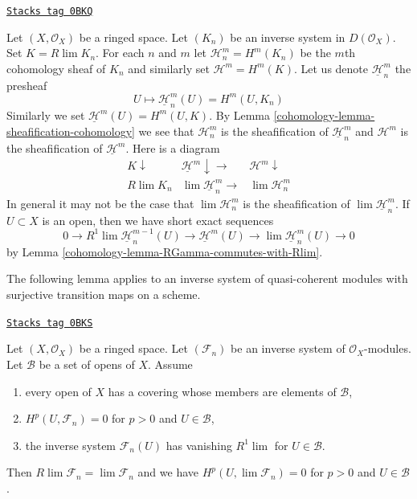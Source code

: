 \begin{remark}
\label{cohomology-remark-discuss-derived-limit}
\href{https://stacks.math.columbia.edu/tag/0BKQ}{\texttt{Stacks tag 0BKQ}}

Let $(X, \mathcal{O}_X)$ be a ringed space. Let $(K_n)$ be an inverse
system in $D(\mathcal{O}_X)$. Set $K = R\lim K_n$. For each $n$ and $m$
let $\mathcal{H}^m_n = H^m(K_n)$ be the $m$th cohomology sheaf of
$K_n$ and similarly set $\mathcal{H}^m = H^m(K)$. Let us denote
$\underline{\mathcal{H}}^m_n$ the presheaf
$$
U \longmapsto \underline{\mathcal{H}}^m_n(U) = H^m(U, K_n)
$$
Similarly we set $\underline{\mathcal{H}}^m(U) = H^m(U, K)$.
By Lemma \ref{cohomology-lemma-sheafification-cohomology} we see that
$\mathcal{H}^m_n$ is the sheafification of
$\underline{\mathcal{H}}^m_n$ and $\mathcal{H}^m$ is the
sheafification of $\underline{\mathcal{H}}^m$.
Here is a diagram
$$
\begin{array}{ccc}K \downarrow & \underline{\mathcal{H}}^m \downarrow\longrightarrow & \mathcal{H}^m \downarrow \\ R\lim K_n & \lim \underline{\mathcal{H}}^m_n \longrightarrow & \lim \mathcal{H}^m_n\end{array}
$$
In general it may not be the case that
$\lim \mathcal{H}^m_n$ is the sheafification of
$\lim \underline{\mathcal{H}}^m_n$.
If $U \subset X$ is an open, then we have short exact
sequences
\begin{equation}
\label{equation-ses-Rlim-over-U}
0 \to
R^1\lim \underline{\mathcal{H}}^{m - 1}_n(U) \to
\underline{\mathcal{H}}^m(U) \to
\lim \underline{\mathcal{H}}^m_n(U) \to 0
\end{equation}
by Lemma \ref{cohomology-lemma-RGamma-commutes-with-Rlim}.
\end{remark}

The following lemma applies to an inverse system of quasi-coherent
modules with surjective transition maps on a scheme.

\begin{lemma}
\label{cohomology-lemma-inverse-limit-is-derived-limit}
\href{https://stacks.math.columbia.edu/tag/0BKS}{\texttt{Stacks tag 0BKS}}

Let $(X, \mathcal{O}_X)$ be a ringed space. Let $(\mathcal{F}_n)$ be an
inverse system of $\mathcal{O}_X$-modules. Let $\mathcal{B}$ be a set
of opens of $X$. Assume
\begin{enumerate}
\item every open of $X$ has a covering whose members are elements of
$\mathcal{B}$,
\item $H^p(U, \mathcal{F}_n) = 0$ for $p > 0$ and $U \in \mathcal{B}$,
\item the inverse system $\mathcal{F}_n(U)$ has vanishing $R^1\lim$
for $U \in \mathcal{B}$.
\end{enumerate}
Then $R\lim \mathcal{F}_n = \lim \mathcal{F}_n$ and we have
$H^p(U, \lim \mathcal{F}_n) = 0$ for $p > 0$ and $U \in \mathcal{B}$.
\end{lemma}

